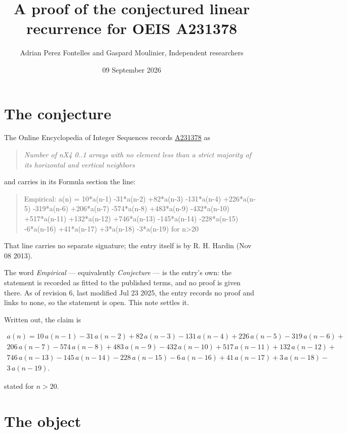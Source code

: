 \documentclass[11pt]{article}
\title{A proof of the conjectured linear recurrence for OEIS A231378}
\author{Adrian Perez Fontelles and Gaspard Moulinier, Independent researchers}
\date{09 September 2026}
\theoremstyle{definition}
\begin{document}
\maketitle
\section{The conjecture}

The Online Encyclopedia of Integer Sequences records \href{https://oeis.org/A231378}{A231378} as

\begin{quote}\itshape Number of nX4 0..1 arrays with no element less than a strict majority of its horizontal and vertical neighbors\end{quote}

and carries in its Formula section the line:

\begin{quote}\ttfamily Empirical: a(n) = 10*a(n-1) -31*a(n-2) +82*a(n-3) -131*a(n-4) +226*a(n-5) -319*a(n-6) +206*a(n-7) -574*a(n-8) +483*a(n-9) -432*a(n-10) +517*a(n-11) +132*a(n-12) +746*a(n-13) -145*a(n-14) -228*a(n-15) -6*a(n-16) +41*a(n-17) +3*a(n-18) -3*a(n-19) for n>20\end{quote}

That line carries no separate signature; the entry itself is by R. H. Hardin (Nov 08 2013).

The word {\itshape Empirical} --- equivalently {\itshape Conjecture} --- is the entry's own: the statement is recorded as fitted to the published terms, and no proof is given there. As of revision 6, last modified Jul 23 2025, the entry records no proof and links to none, so the statement is open. This note settles it.

Written out, the claim is

\begin{multline*} a(n) = 10\,a(n-1) - 31\,a(n-2) + 82\,a(n-3) - 131\,a(n-4) + 226\,a(n-5) - 319\,a(n-6) + \\ 206\,a(n-7) - 574\,a(n-8) + 483\,a(n-9) - 432\,a(n-10) + 517\,a(n-11) + 132\,a(n-12) + \\ 746\,a(n-13) - 145\,a(n-14) - 228\,a(n-15) - 6\,a(n-16) + 41\,a(n-17) + 3\,a(n-18) - \\ 3\,a(n-19). \end{multline*}

stated for $n > 20$.

\section{The object}
\end{document}
